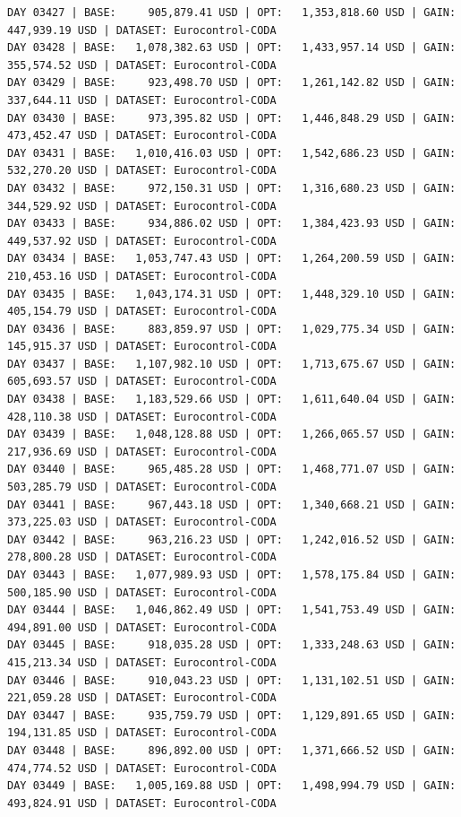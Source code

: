 \documentclass[11pt,a4paper]{article}
\begin{document}
\begin{verbatim}
DAY 03427 | BASE:     905,879.41 USD | OPT:   1,353,818.60 USD | GAIN: 447,939.19 USD | DATASET: Eurocontrol-CODA
DAY 03428 | BASE:   1,078,382.63 USD | OPT:   1,433,957.14 USD | GAIN: 355,574.52 USD | DATASET: Eurocontrol-CODA
DAY 03429 | BASE:     923,498.70 USD | OPT:   1,261,142.82 USD | GAIN: 337,644.11 USD | DATASET: Eurocontrol-CODA
DAY 03430 | BASE:     973,395.82 USD | OPT:   1,446,848.29 USD | GAIN: 473,452.47 USD | DATASET: Eurocontrol-CODA
DAY 03431 | BASE:   1,010,416.03 USD | OPT:   1,542,686.23 USD | GAIN: 532,270.20 USD | DATASET: Eurocontrol-CODA
DAY 03432 | BASE:     972,150.31 USD | OPT:   1,316,680.23 USD | GAIN: 344,529.92 USD | DATASET: Eurocontrol-CODA
DAY 03433 | BASE:     934,886.02 USD | OPT:   1,384,423.93 USD | GAIN: 449,537.92 USD | DATASET: Eurocontrol-CODA
DAY 03434 | BASE:   1,053,747.43 USD | OPT:   1,264,200.59 USD | GAIN: 210,453.16 USD | DATASET: Eurocontrol-CODA
DAY 03435 | BASE:   1,043,174.31 USD | OPT:   1,448,329.10 USD | GAIN: 405,154.79 USD | DATASET: Eurocontrol-CODA
DAY 03436 | BASE:     883,859.97 USD | OPT:   1,029,775.34 USD | GAIN: 145,915.37 USD | DATASET: Eurocontrol-CODA
DAY 03437 | BASE:   1,107,982.10 USD | OPT:   1,713,675.67 USD | GAIN: 605,693.57 USD | DATASET: Eurocontrol-CODA
DAY 03438 | BASE:   1,183,529.66 USD | OPT:   1,611,640.04 USD | GAIN: 428,110.38 USD | DATASET: Eurocontrol-CODA
DAY 03439 | BASE:   1,048,128.88 USD | OPT:   1,266,065.57 USD | GAIN: 217,936.69 USD | DATASET: Eurocontrol-CODA
DAY 03440 | BASE:     965,485.28 USD | OPT:   1,468,771.07 USD | GAIN: 503,285.79 USD | DATASET: Eurocontrol-CODA
DAY 03441 | BASE:     967,443.18 USD | OPT:   1,340,668.21 USD | GAIN: 373,225.03 USD | DATASET: Eurocontrol-CODA
DAY 03442 | BASE:     963,216.23 USD | OPT:   1,242,016.52 USD | GAIN: 278,800.28 USD | DATASET: Eurocontrol-CODA
DAY 03443 | BASE:   1,077,989.93 USD | OPT:   1,578,175.84 USD | GAIN: 500,185.90 USD | DATASET: Eurocontrol-CODA
DAY 03444 | BASE:   1,046,862.49 USD | OPT:   1,541,753.49 USD | GAIN: 494,891.00 USD | DATASET: Eurocontrol-CODA
DAY 03445 | BASE:     918,035.28 USD | OPT:   1,333,248.63 USD | GAIN: 415,213.34 USD | DATASET: Eurocontrol-CODA
DAY 03446 | BASE:     910,043.23 USD | OPT:   1,131,102.51 USD | GAIN: 221,059.28 USD | DATASET: Eurocontrol-CODA
DAY 03447 | BASE:     935,759.79 USD | OPT:   1,129,891.65 USD | GAIN: 194,131.85 USD | DATASET: Eurocontrol-CODA
DAY 03448 | BASE:     896,892.00 USD | OPT:   1,371,666.52 USD | GAIN: 474,774.52 USD | DATASET: Eurocontrol-CODA
DAY 03449 | BASE:   1,005,169.88 USD | OPT:   1,498,994.79 USD | GAIN: 493,824.91 USD | DATASET: Eurocontrol-CODA

\end{verbatim}
\end{document}
